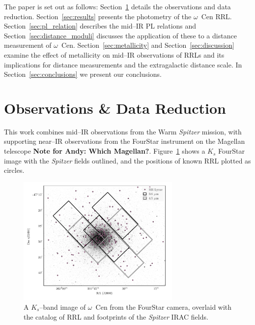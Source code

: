 \documentclass[a4paper,fleqn,usenatbib]{mnras}
\begin{document}
The paper is set out as follows: Section~\ref{sec:observations} details the observations and data reduction. Section~\ref{sec:results} presents the photometry of the $\omega$~Cen RRL. Section~\ref{sec:pl_relation} describes the mid--IR PL relations and Section~\ref{sec:distance_moduli} discusses the application of these to a distance measurement of  $\omega$~Cen. Section~\ref{sec:metallicity} and Section~\ref{sec:discussion} examine the effect of metallicity on mid--IR observations of RRLs and its implications for distance measurements and the extragalactic distance scale. In Section~\ref{sec:conclusions} we present our conclusions.

\section{Observations \& Data Reduction}
\label{sec:observations}
This work combines mid--IR observations from the Warm {\it Spitzer} mission, with supporting near--IR observations from the FourStar instrument on the Magellan telescope \citep{2013PASP..125..654P} {\bf Note for Andy: Which Magellan?}. Figure~\ref{fig:omegaCen_fields} shows a $K_s$ FourStar image with the {\it Spitzer} fields outlined, and the positions of known RRL plotted as circles.

\begin{figure}
\begin{center}
\includegraphics[width=80mm]{final_plots/omegacen_coverage_map.pdf}
\caption{A $K_s$--band image of $\omega$~Cen from the FourStar camera, overlaid with the catalog of RRL \citep{2004A&A...424.1101K} and footprints of the {\it Spitzer} IRAC fields.}
\label{fig:omegaCen_fields}
\end{center}
\end{figure}
\end{document}
